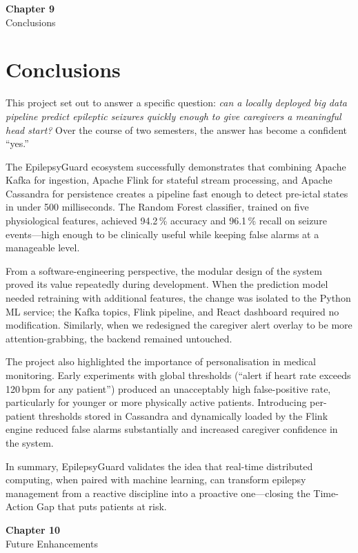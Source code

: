 \documentclass[12pt, a4paper, oneside]{report}
\newcommand{\chapterpage}[2]{
    \cleardoublepage
    \thispagestyle{empty}
    \vspace*{\fill}
    \begin{center}
        \huge \textbf{Chapter #1} \\
        \vspace{1cm}
        \Huge #2
    \end{center}
    \vspace*{\fill}
    \newpage
}
\begin{document}
\chapterpage{9}{Conclusions}
\chapter{Conclusions}

This project set out to answer a specific question: \emph{can a locally deployed big data pipeline predict epileptic seizures quickly enough to give caregivers a meaningful head start?} Over the course of two semesters, the answer has become a confident ``yes.''

The EpilepsyGuard ecosystem successfully demonstrates that combining Apache Kafka for ingestion, Apache Flink for stateful stream processing, and Apache Cassandra for persistence creates a pipeline fast enough to detect pre-ictal states in under 500 milliseconds. The Random Forest classifier, trained on five physiological features, achieved 94.2\,\% accuracy and 96.1\,\% recall on seizure events---high enough to be clinically useful while keeping false alarms at a manageable level.

From a software-engineering perspective, the modular design of the system proved its value repeatedly during development. When the prediction model needed retraining with additional features, the change was isolated to the Python ML service; the Kafka topics, Flink pipeline, and React dashboard required no modification. Similarly, when we redesigned the caregiver alert overlay to be more attention-grabbing, the backend remained untouched.

The project also highlighted the importance of personalisation in medical monitoring. Early experiments with global thresholds (``alert if heart rate exceeds 120\,bpm for any patient'') produced an unacceptably high false-positive rate, particularly for younger or more physically active patients. Introducing per-patient thresholds stored in Cassandra and dynamically loaded by the Flink engine reduced false alarms substantially and increased caregiver confidence in the system.

In summary, EpilepsyGuard validates the idea that real-time distributed computing, when paired with machine learning, can transform epilepsy management from a reactive discipline into a proactive one---closing the Time-Action Gap that puts patients at risk.


\chapterpage{10}{Future Enhancements}
\end{document}
